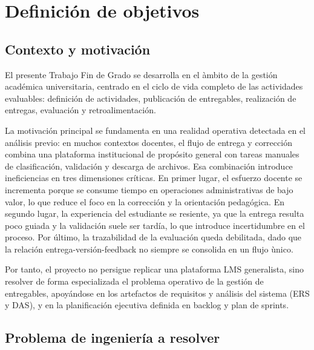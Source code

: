 \chapter{Definici\'on de objetivos}\label{defobjetivos}
\makeatletter
{}
\makeatother

\FloatBarrier
\section{Contexto y motivaci\'on}

El presente Trabajo Fin de Grado se desarrolla en el \`ambito de la gesti\'on acad\'emica universitaria,
centrado en el ciclo de vida completo de las actividades evaluables:
definici\'on de actividades, publicaci\'on de entregables, realizaci\'on de entregas,
evaluaci\'on y retroalimentaci\'on.

La motivaci\'on principal se fundamenta en una realidad operativa detectada en el an\'alisis previo:
en muchos contextos docentes, el flujo de entrega y correcci\'on combina una plataforma institucional
de prop\'osito general con tareas manuales de clasificaci\'on, validaci\'on y descarga de archivos.
Esa combinaci\'on introduce ineficiencias en tres dimensiones cr\'iticas. En primer lugar, el esfuerzo docente se incrementa porque se consume tiempo en operaciones administrativas de bajo valor, lo que reduce el foco en la correcci\'on y la orientaci\'on pedag\'ogica. En segundo lugar, la experiencia del estudiante se resiente, ya que la entrega resulta poco guiada y la validaci\'on suele ser tard\'ia, lo que introduce incertidumbre en el proceso. Por \'ultimo, la trazabilidad de la evaluaci\'on queda debilitada, dado que la relaci\'on entrega-versi\'on-feedback no siempre se consolida en un flujo \`unico.

Por tanto, el proyecto no persigue replicar una plataforma LMS generalista,
sino resolver de forma especializada el problema operativo de la gesti\'on de entregables,
apoy\'andose en los artefactos de requisitos y an\'alisis del sistema (ERS y DAS),
y en la planificaci\'on ejecutiva definida en backlog y plan de sprints.

\FloatBarrier
\section{Problema de ingenier\'ia a resolver}

